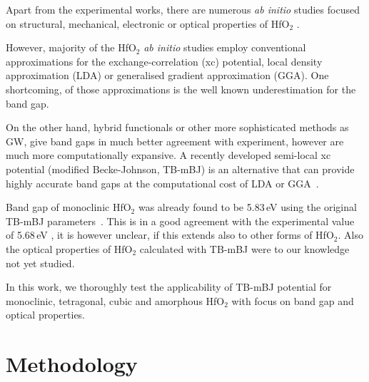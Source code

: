\documentclass[10pt,a4paper,twocolumn]{article}
\begin{document}
Apart from the experimental works, there are numerous \textit{ab initio} studies focused on structural, mechanical, electronic or optical properties of HfO$_2$ \cite{Caravaca2005, Broqvist2007, Ceresoli2006, Garcia2004, Kaneta2007, Liu2009, Scopel2008, Terki2008, Zhao2002, Gruning2010}.

However, majority of the HfO$_2$ \textit{ab initio} studies employ conventional approximations for the exchange-correlation (xc) potential, local density approximation (LDA) or generalised gradient approximation (GGA).
One shortcoming, of those approximations is the well known underestimation for the band gap.


On the other hand, hybrid functionals or other more sophisticated methods as GW, give band gaps in much better agreement with experiment, however are much more computationally expansive.
A recently developed semi-local xc potential (modified Becke-Johnson, TB-mBJ) is an alternative that can provide highly accurate band gaps at the computational cost of LDA or GGA~\cite{Tran2009}.

Band gap of monoclinic HfO$_2$ was already found to be 5.83\,eV using the original TB-mBJ parameters~\cite{Koller2012}.
This is in a good agreement with the experimental value of 5.68\,eV \cite{Balog1977}, it is however unclear, if this extends also to other forms of HfO$_2$.
Also the optical properties of HfO$_2$ calculated with TB-mBJ were to our knowledge not yet studied.


In this work, we thoroughly test the applicability of TB-mBJ potential for monoclinic, tetragonal, cubic and amorphous HfO$_2$ with focus on band gap and optical properties.

\section{Methodology}
\end{document}
